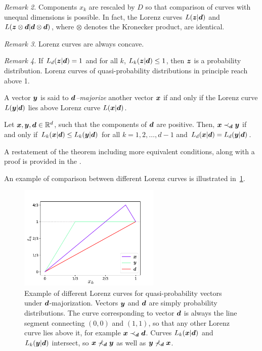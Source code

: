 \documentclass[pra,
aps,
twocolumn,
superscriptaddress,
groupedaddress,
nofootinbib,
reprint
]{revtex4-1}
\begin{document}
\emph{Remark 2.} Components $x_k$ are rescaled by $D$ so that comparison of curves with unequal dimensions is possible.
In fact, the Lorenz curves $L(\bm{z}|\bm{d})$ and $L(\bm{z} \otimes \bm{d}|\bm{d} \otimes \bm{d})$, where $\otimes$ denotes the Kronecker product, are identical.

\emph{Remark 3.} Lorenz curves are always concave.

\emph{Remark 4.} If $L_d(\bm{z}|\bm{d}) = 1$ and for all $k$, $L_k(\bm{z}|\bm{d}) \leq 1$, then $\bm{z}$ is a probability distribution.
Lorenz curves of quasi-probability distributions in principle reach above 1.

A vector $\bm{y}$ is said to \emph{$\bm{d}$--majorize} another vector $\bm{x}$  if and only if the Lorenz curve $L(\bm{y}|\bm{d})$ lies above Lorenz curve $L(\bm{x}|\bm{d})$.
\begin{theorem}\label{thm:dmajor}
    Let $\bm{x}, \bm{y}, \bm{d} \in \mathbb{R}^d$, such that the components of $\bm{d}$ are positive. 
    Then, $\bm{x} \prec_{\bm{d}} \bm{y}$ if and only if $L_k(\bm{x}|\bm{d}) \leq L_k(\bm{y}|\bm{d})$ for all $k=1,2,\dots, d-1$ and $L_d(\bm{x}|\bm{d}) = L_d(\bm{y}|\bm{d})$.
\end{theorem}
A restatement of the theorem including more equivalent conditions, along with a proof is provided in the .

An example of comparison between different Lorenz curves is illustrated in~\cref{fig:lctoy}.
\begin{figure}
    \centering
    \includegraphics[height=5cm]{figs/lctoy.pdf}
    \caption{Example of different Lorenz curves for quasi-probability vectors under $\bm{d}$-majorization.
    Vectors $\bm{y}$ and $\bm{d}$ are simply probability distributions.
    The curve corresponding to vector $\bm{d}$ is always the line segment connecting $(0,0)$ and $(1,1)$, so that any other Lorenz curve lies above it, for example $\bm{x} \prec_{\bm{d}} \bm{d}$.
    Curves $L_k(\bm{x}|\bm{d})$ and $L_k(\bm{y}|\bm{d})$ intersect, so $\bm{x} \nprec_{\bm{d}} \bm{y}$ as well as $\bm{y} \nprec_{\bm{d}} \bm{x}$.
    }
    \label{fig:lctoy}
\end{figure}
\end{document}
